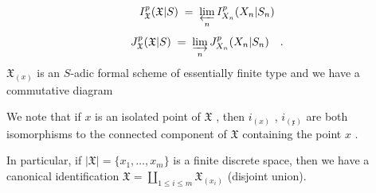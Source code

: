 \begin{equation*}
 I^p_{\mathfrak{X}}(\mathfrak{X}|S) \;=\; \varprojlim_{n} I^p_{X_n}(X_n|S_n)
\end{equation*}
\begin{equation*}
J^p_{\mathfrak{X}}(\mathfrak{X}|S) \;=\; \varinjlim_{n} J^p_{X_n}(X_n|S_n) \quad .
\end{equation*}
$\mathfrak{X}_{(x)}$ is an $S$-adic formal scheme of essentially finite type and we have a commutative diagram

\begin{center}
\end{center}
We note that if $x$ is an isolated point of $\mathfrak{X}$ , then $i_{(x)}$ , $i_{(\mathfrak{x})}$ are both isomorphisms to the connected component of $\mathfrak{X}$ containing the point $x$ .

In particular, if $|\mathfrak{X}| = \{x_1,\dots,x_m\}$ is a finite discrete space, then we have a canonical identification $\mathfrak{X} = \coprod_{1 \leq i \leq m} \mathfrak{X}_{(x_i)}$ (disjoint union).


